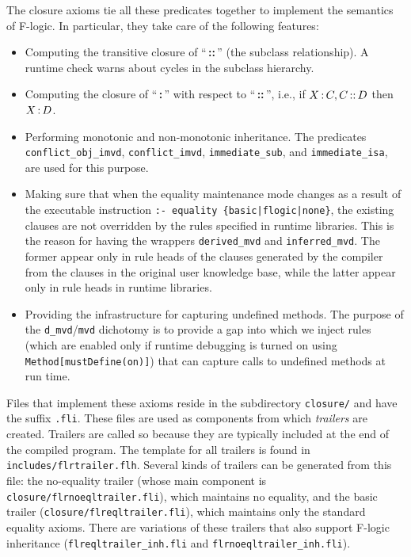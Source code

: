 \documentclass[11pt]{article}
\newcommand{\ERGO}{\mbox{\smaller{\ensuremath{\cal{E}}\smaller{{\sc{RGO}}}}}\xspace}
\newcommand{\FLSYSTEM}{\ERGO}
\newcommand{\isa}{\,{\bf{:}}\,}
\newcommand{\subcl}{\,{\bf{::}}\,}
\newcommand{\fl}{\mbox{F-logic}\xspace}
\begin{document}
The closure axioms tie all these predicates together to implement the
semantics of \fl. In particular, they take care of the following features:
\begin{itemize}
\item Computing the transitive closure of ``\subcl'' (the subclass
  relationship).  A runtime check warns about cycles in the subclass
  hierarchy.
\item Computing the closure of ``\isa'' with respect to ``\subcl'', i.e.,
  if $X\isa C, C\subcl D$ then $X\isa D$.
\item Performing monotonic and non-monotonic inheritance. The predicates
  {\tt conflict\_obj\_imvd}, {\tt conflict\_imvd}, {\tt immediate\_sub},
  and {\tt immediate\_isa}, are used for this purpose.
\item Making sure that when the equality maintenance mode changes as a
  result of the executable instruction {\tt :- equality
  \{basic|flogic|none\}}, the existing clauses are not overridden by the
  rules specified in \FLSYSTEM runtime libraries. This is the reason for
  having the wrappers {\tt derived\_mvd} and {\tt inferred\_mvd}. The former
  appear only in rule heads of the clauses generated by the compiler
  from the clauses in the original user knowledge base, while the latter appear only in
  rule heads in runtime libraries.
\item Providing the infrastructure for capturing undefined methods.
  The purpose of the {\tt d\_mvd}/{\tt mvd} dichotomy is to provide a gap
  into which we inject rules
  (which are enabled only if runtime debugging is turned on using
  {\tt Method[mustDefine(on)]}) that can capture calls to undefined
  methods at run time.
\end{itemize}
Files that implement these axioms reside in the subdirectory
\texttt{closure/} and have the suffix {\tt .fli}.  These files are used as
components from which \FLSYSTEM \emph{trailers} are created.  Trailers are
called so because they are typically included at the end of the compiled
program. The template for all trailers is found in
{\tt includes/flrtrailer.flh}.  Several kinds of trailers can be generated from
this file: the no-equality trailer (whose main component is {\tt
  closure/flrnoeqltrailer.fli}), which maintains no equality, and the basic
trailer ({\tt closure/flreqltrailer.fli}), which maintains only the
standard equality axioms.
There are variations of these trailers that also support \fl inheritance
({\tt flreqltrailer\_inh.fli}  and {\tt flrnoeqltrailer\_inh.fli}).
\end{document}

